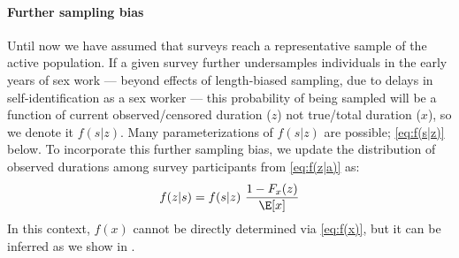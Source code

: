 \paragraph{Further sampling bias}
Until now we have assumed that surveys reach
a representative sample of the active population.
If a given survey further undersamples individuals in the early years of sex work
--- \ie beyond effects of length-biased sampling,
due to delays in self-identification as a sex worker \cite{Cheuk2020} ---
this probability of being sampled will be a function of
current observed/censored duration ($z$) not true/total duration ($x$),
so we denote it $f(s|z)$.
Many parameterizations of $f(s|z)$ are possible; \eg \eqref{eq:f(s|z)} below.
To incorporate this further sampling bias, we update
the distribution of observed durations among survey participants
from \eqref{eq:f(z|a)} as:
\begin{equation}
  f(z|s) = f(s|z) ~ \frac{1 - F_x(z)}{\E[x]}
  \label{eq:f(z|s)}
\end{equation}
In this context, $f(x)$ cannot be directly determined via \eqref{eq:f(x)},
but it can be inferred as we show in .
